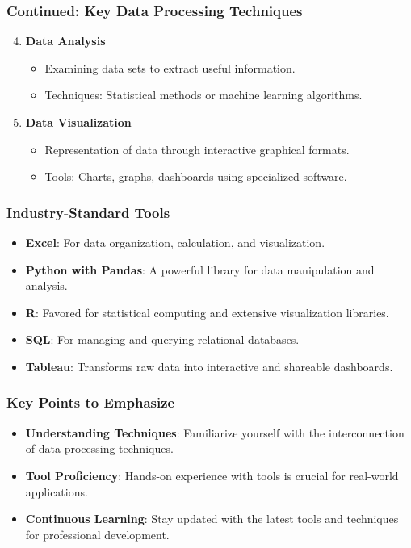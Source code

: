 \documentclass[aspectratio=169]{beamer}
\begin{document}
\begin{frame}
    \frametitle{Continued: Key Data Processing Techniques}
    \begin{enumerate}
        \setcounter{enumi}{3} %
        \item \textbf{Data Analysis}
            \begin{itemize}
                \item Examining data sets to extract useful information.
                \item Techniques: Statistical methods or machine learning algorithms.
            \end{itemize}
        \item \textbf{Data Visualization}
            \begin{itemize}
                \item Representation of data through interactive graphical formats.
                \item Tools: Charts, graphs, dashboards using specialized software.
            \end{itemize}
    \end{enumerate}
\end{frame}

\begin{frame}
    \frametitle{Industry-Standard Tools}
    \begin{itemize}
        \item \textbf{Excel}: For data organization, calculation, and visualization.
        \item \textbf{Python with Pandas}: A powerful library for data manipulation and analysis.
        \item \textbf{R}: Favored for statistical computing and extensive visualization libraries.
        \item \textbf{SQL}: For managing and querying relational databases.
        \item \textbf{Tableau}: Transforms raw data into interactive and shareable dashboards.
    \end{itemize}
\end{frame}

\begin{frame}
    \frametitle{Key Points to Emphasize}
    \begin{itemize}
        \item \textbf{Understanding Techniques}: Familiarize yourself with the interconnection of data processing techniques.
        \item \textbf{Tool Proficiency}: Hands-on experience with tools is crucial for real-world applications.
        \item \textbf{Continuous Learning}: Stay updated with the latest tools and techniques for professional development.
    \end{itemize}
\end{frame}
\end{document}
